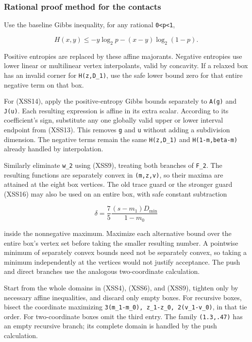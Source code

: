\hypertarget{af-a9ec399514-rational-proof-method-for-the-contacts}{%
\subsubsection{Rational proof method for the contacts}\label{af-a9ec399514-rational-proof-method-for-the-contacts}}

Use the baseline Gibbs inequality, for any rational \texttt{0\textless{}p\textless{}1},

\[
H(x,y)\le-y\log_2p-(x-y)\log_2(1-p).
 \tag{XSS18}
\]

Positive entropies are replaced by these affine majorants. Negative entropies use lower linear or multilinear vertex interpolants, valid by concavity. If a relaxed box has an invalid corner for \texttt{H(z,D\_1)}, use the safe lower bound zero for that entire negative term on that box.

For (XSS14), apply the positive-entropy Gibbs bounds separately to \texttt{A(g)} and \texttt{J(u)}. Each resulting expression is affine in its extra scalar. According to its coefficient's sign, substitute any one globally valid upper or lower interval endpoint from (XSS13). This removes \texttt{g} and \texttt{u} without adding a subdivision dimension. The negative terms remain the same \texttt{H(z,D\_1)} and \texttt{H(1-m,beta-m)} already handled by interpolation.

Similarly eliminate \texttt{w\_2} using (XSS9), treating both branches of \texttt{F\_2}. The resulting functions are separately convex in \texttt{(m,z,v)}, so their maxima are attained at the eight box vertices. The old trace guard or the stronger guard (XSS16) may also be used on an entire box, with safe constant subtraction

\[
\delta=\frac75\frac{(s-m_1)D_{\min}}{1-m_0}
\]

inside the nonnegative maximum. Maximize each alternative bound over the entire box's vertex set before taking the smaller resulting number. A pointwise minimum of separately convex bounds need not be separately convex, so taking a minimum independently at the vertices would not justify acceptance. The push and direct branches use the analogous two-coordinate calculation.

Start from the whole domains in (XSS4), (XSS6), and (XSS9), tighten only by necessary affine inequalities, and discard only empty boxes. For recursive boxes, bisect the coordinate maximizing \texttt{3(m\_1-m\_0),\ z\_1-z\_0,\ 2(v\_1-v\_0)}, in that tie order. For two-coordinate boxes omit the third entry. The family \texttt{(1.3,.47)} has an empty recursive branch; its complete domain is handled by the push calculation.

